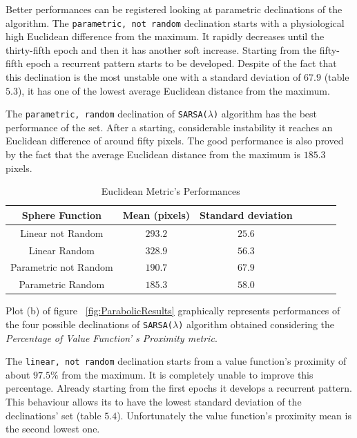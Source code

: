 Better performances can be registered looking at parametric declinations of the algorithm. The {\tt parametric, not random} declination starts with a physiological high Euclidean difference from the maximum. It rapidly decreases until the thirty-fifth epoch and then it has another soft increase. Starting from the fifty-fifth epoch a recurrent pattern starts to be developed. Despite of the fact that this declination is the most unstable one with a standard deviation of $67.9$ (table $5.3$), it has one of the lowest average Euclidean distance from the maximum. 

The {\tt parametric, random} declination of {\tt SARSA($\lambda$)} algorithm has the best performance of the set. After a starting, considerable instability it reaches an Euclidean difference of around fifty pixels. The good performance is also proved by the fact that the average Euclidean distance from the maximum is $185.3$ pixels. \\

\begin{table}[h!]
	\centering
	\resizebox{\linewidth}{!} {
	\begin{tabular}{c| cccccc} 
		\hline \textbf{Sphere Function}
		& \textbf{Mean (pixels)} & \textbf{Standard deviation} \\ 
		\hline Linear not Random
		& $293.2$ &\cellcolor{red!25} $25.6$  \\ 
		\hline Linear Random
		& $328.9$ & $56.3$ \\ 
		\hline Parametric not Random
		& $190.7$ & $67.9$ \\ 
		\hline Parametric Random
		& \cellcolor{red!25} $185.3$ & $58.0$ \\ 
		\hline 
	\end{tabular} 
}
\label{ParabolicTabEuclidean}
\caption{Euclidean Metric's Performances}
\end{table}

Plot (b) of figure ~\ref{fig:ParabolicResults} graphically represents performances of the four possible declinations of {\tt SARSA($\lambda$)} algorithm obtained considering the \textit{Percentage of Value Function' s Proximity metric}. 

The {\tt linear, not random} declination starts from a value function's proximity of about $97.5\%$ from the maximum. It is completely unable to improve this percentage. Already starting from the first epochs it develops a recurrent pattern. This behaviour allows its to have the lowest standard deviation of the declinations' set (table $5.4$). Unfortunately the value function's proximity mean is the second lowest one. 
 
